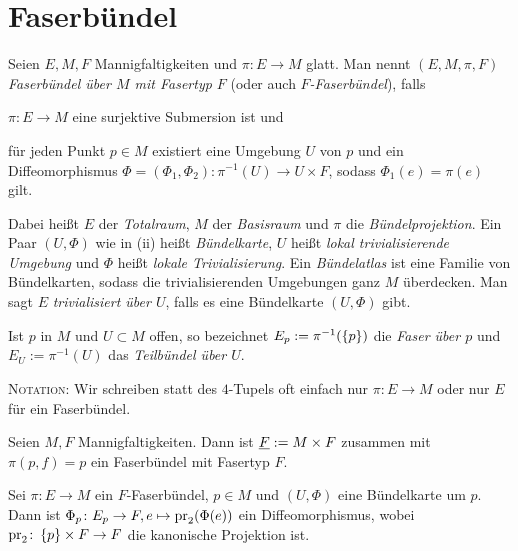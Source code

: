 \section{Faserbündel}
\label{sec:faserbl}

\begin{definition}
  Seien $E,M,F$ Mannigfaltigkeiten und $\pi\colon E \to M$ glatt. Man
  nennt $(E,M,\pi,F)$ \emph{Faserbündel über $M$ mit Fasertyp $F$} (oder auch \emph{$F$-Faserbündel}), falls
  \begin{properties}
  \item $\pi\colon E \to M$ eine surjektive Submersion ist und
  \item für jeden Punkt $p\in M$ existiert eine Umgebung $U$ von $p$
    und ein Diffeomorphismus $\Phi = (\Phi_1,\Phi_2) \colon \pi^{-1}(U) \to U\times F$,
    sodass $\Phi_1(e) = \pi(e)$ gilt.
  \end{properties}
  Dabei heißt $E$ der \emph{Totalraum}, $M$ der \emph{Basisraum} und
  $\pi$ die \emph{Bündelprojektion}. Ein Paar $(U,\Phi)$ wie in (ii)
  heißt \emph{Bündelkarte}, $U$ heißt \emph{lokal trivialisierende
    Umgebung} und $\Phi$ heißt \emph{lokale Trivialisierung}. Ein
  \emph{Bündelatlas} ist eine Familie von Bündelkarten, sodass die
  trivialisierenden Umgebungen ganz $M$ überdecken. Man sagt $E$
  \emph{trivialisiert über $U$}, falls es eine Bündelkarte $(U,\Phi)$ gibt.

  Ist $p$ in $M$ und $U\subset M$ offen, so bezeichnet $E_p :=
  \pi^{-1}(\left\lbrace p \right\rbrace)$ die \emph{Faser über  $p$} und $E_U :=
  \pi^{-1}(U)$ das \emph{Teilbündel über $U$}.

  \textsc{Notation:} Wir schreiben statt des $4$-Tupels oft einfach
  nur $\pi\colon E\to M$ oder nur $E$ für ein Faserbündel.
\end{definition}

\begin{proposition}
  Seien $M,F$ Mannigfaltigkeiten. Dann ist $\underline{F} := M\times F$ zusammen mit
  $\pi(p,f) = p$ ein Faserbündel mit Fasertyp $F$.
\end{proposition}

\begin{proposition}
  Sei $\pi\colon E\to M$ ein $F$-Faserbündel, $p\in M$ und $(U,\Phi)$
  eine Bündelkarte um $p$. Dann ist $\Phi_p \colon E_p \to F, e
  \mapsto \operatorname{pr}_2(\Phi(e))$ ein Diffeomorphismus, wobei $\operatorname{pr}_2 \colon
  \left\lbrace p \right\rbrace \times F \to F$ die kanonische Projektion ist.
\end{proposition}

